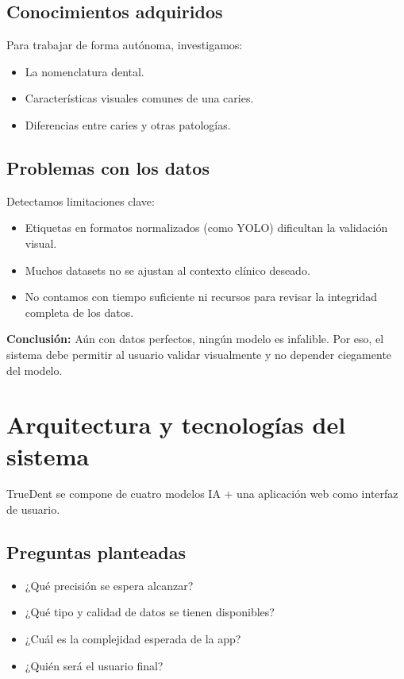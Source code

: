 \documentclass[a4paper,12pt]{article}
\begin{document}
\subsection*{Conocimientos adquiridos}

Para trabajar de forma autónoma, investigamos:

\begin{itemize}
    \item La nomenclatura dental.
    \item Características visuales comunes de una caries.
    \item Diferencias entre caries y otras patologías.
\end{itemize}

\subsection*{Problemas con los datos}

Detectamos limitaciones clave:

\begin{itemize}
    \item Etiquetas en formatos normalizados (como YOLO) dificultan la validación visual.
    \item Muchos datasets no se ajustan al contexto clínico deseado.
    \item No contamos con tiempo suficiente ni recursos para revisar la integridad completa de los datos.
\end{itemize}

\textbf{Conclusión:} Aún con datos perfectos, ningún modelo es infalible. Por eso, el sistema debe permitir al usuario validar visualmente y no depender ciegamente del modelo.

\section{Arquitectura y tecnologías del sistema}

TrueDent se compone de cuatro modelos IA + una aplicación web como interfaz de usuario.

\subsection*{Preguntas planteadas}

\begin{itemize}
    \item ¿Qué precisión se espera alcanzar?
    \item ¿Qué tipo y calidad de datos se tienen disponibles?
    \item ¿Cuál es la complejidad esperada de la app?
    \item ¿Quién será el usuario final?
\end{itemize}
\end{document}
